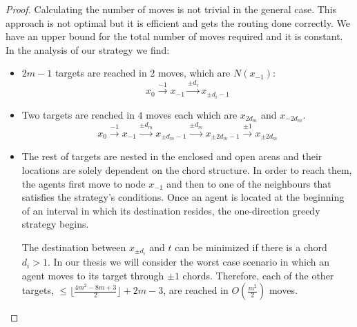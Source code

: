\begin{proof}
Calculating the number of moves is not trivial in the general case. This approach is not optimal but it is efficient and gets the routing done correctly. We have an upper bound for the total number of moves required and it is constant. In the analysis of our strategy we find:
\begin{itemize}

\item $2m-1$ targets are reached in $2$ moves, which are $N(x_{-1})$:
$$ x_{0}\xrightarrow {-1}x_{-1} \xrightarrow {\pm d_i} x_{\pm d_i-1}$$

\item Two targets are reached in $4$ moves each which are  $x_{2d_m}$ and $x_{-2d_m}$.
$$ x_{0}\xrightarrow {-1}x_{-1} \xrightarrow {\pm d_m} x_{\pm d_m-1} \xrightarrow {\pm d_m} x_{\pm 2d_m-1}\xrightarrow {\pm 1} x_{\pm 2d_m}$$

\item The rest of targets are nested in the enclosed and open areas and their locations are solely dependent on the chord structure. 
In order to reach them, the agents first move to  node $x_{-1}$ and then to one of the neighbours that satisfies the strategy's conditions. Once an agent is located at the beginning of an interval in which its destination resides, the one-direction greedy strategy begins. 

 The destination between $x_{\pm d_i}$ and $t$ can be minimized if there is a chord $d_i>1$. In our thesis we will consider the worst case scenario in which an agent moves to its target through $\pm 1$ chords. Therefore, each of the other targets, $\leq \lfloor \frac {4m^2-8m+3}{2} \rfloor +2m-3$, are reached in  $O(\frac {m^2} { 2})$ moves.
\end{itemize}
\end{proof}






